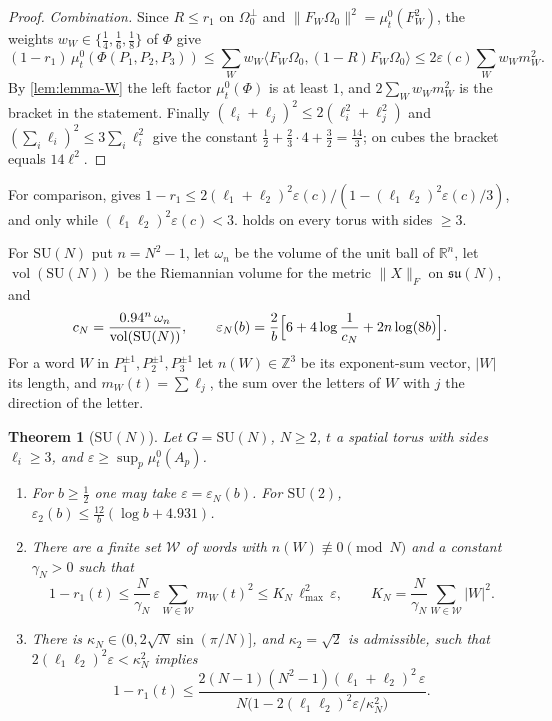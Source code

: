\documentclass[11pt,a4paper]{amsart}
\newtheorem{theorem}{Theorem}[section]
\theoremstyle{definition}
\theoremstyle{remark}
\numberwithin{equation}{section}
\newcommand{\R}{\mathbb{R}}          %
\newcommand{\Z}{\mathbb{Z}}          %
\newcommand{\ip}[2]{\langle #1,#2\rangle}  %
\newcommand{\norm}[1]{\lVert #1\rVert}     %
\newcommand{\abs}[1]{\lvert #1\rvert}      %
\newcommand{\SU}{\mathrm{SU}}              %
\newcommand{\Omegazero}{\Omega_0}          %
\begin{document}
\begin{proof}
\emph{Combination.} Since $R\le r_1$ on $\Omegazero^\perp$ and $\norm{F_W\Omegazero}^2=\mu^0_t(F_W^2)$, the weights $w_W\in\{\frac14,\frac16,\frac18\}$ of $\Phi$ give
\[
(1-r_1)\,\mu^0_t(\Phi(P_1,P_2,P_3))\le\sum_Ww_W\ip{F_W\Omegazero}{(1-R)F_W\Omegazero}\le2\varepsilon(c)\sum_Ww_Wm_W^2 .
\]
By \cref{lem:lemma-W} the left factor $\mu^0_t(\Phi)$ is at least $1$, and $2\sum_Ww_Wm_W^2$ is the bracket in the statement. Finally $(\ell_i+\ell_j)^2\le2(\ell_i^2+\ell_j^2)$ and $(\sum_i\ell_i)^2\le3\sum_i\ell_i^2$ give the constant $\frac12+\frac23\cdot4+\frac32=\frac{14}3$; on cubes the bracket equals $14\ell^2$.
\end{proof}

For comparison, \cite[Theorem~8]{bhattacharjee2026first} gives $1-r_1\le2(\ell_1+\ell_2)^2\varepsilon(c)/(1-(\ell_1\ell_2)^2\varepsilon(c)/3)$, and only while $(\ell_1\ell_2)^2\varepsilon(c)<3$.  holds on every torus with sides $\ge3$.

For $\SU(N)$ put $n=N^2-1$, let $\omega_n$ be the volume of the unit ball of $\R^n$, let $\operatorname{vol}(\SU(N))$ be the Riemannian volume for the metric $\norm{X}_F$ on $\mathfrak{su}(N)$, and
\[
c_N=\frac{0.94^n\,\omega_n}{\operatorname{vol}(\SU(N))},\qquad\varepsilon_N(b)=\frac2b\Bigl[6+4\log\frac1{c_N}+2n\log(8b)\Bigr].
\]
For a word $W$ in $P_1^{\pm1},P_2^{\pm1},P_3^{\pm1}$ let $n(W)\in\Z^3$ be its exponent-sum vector, $\abs W$ its length, and $m_W(t)=\sum\ell_{j}$, the sum over the letters of $W$ with $j$ the direction of the letter.

\begin{theorem}[$\SU(N)$]\label{thm:SUN-gap}
Let $G=\SU(N)$, $N\ge2$, $t$ a spatial torus with sides $\ell_i\ge3$, and $\varepsilon\ge\sup_p\mu^0_t(A_p)$.
\begin{enumerate}[label=\textup{(\alph*)},leftmargin=*]
\item For $b\ge\frac12$ one may take $\varepsilon=\varepsilon_N(b)$. For $\SU(2)$, $\varepsilon_2(b)\le\frac{12}b(\log b+4.931)$.
\item There are a finite set $\mathcal W$ of words with $n(W)\not\equiv0\pmod N$ and a constant $\gamma_N>0$ such that
\[
1-r_1(t)\le\frac N{\gamma_N}\,\varepsilon\sum_{W\in\mathcal W}m_W(t)^2\le K_N\,\ell_{\max}^2\,\varepsilon,\qquad K_N=\frac N{\gamma_N}\sum_{W\in\mathcal W}\abs W^2 .
\]
\item There is $\kappa_N\in(0,2\sqrt N\sin(\pi/N)]$, and $\kappa_2=\sqrt2$ is admissible, such that $2(\ell_1\ell_2)^2\varepsilon<\kappa_N^2$ implies
\[
1-r_1(t)\le\frac{2(N-1)(N^2-1)(\ell_1+\ell_2)^2\,\varepsilon}{N\bigl(1-2(\ell_1\ell_2)^2\varepsilon/\kappa_N^2\bigr)} .
\]
\end{enumerate}
\end{theorem}
\end{document}
